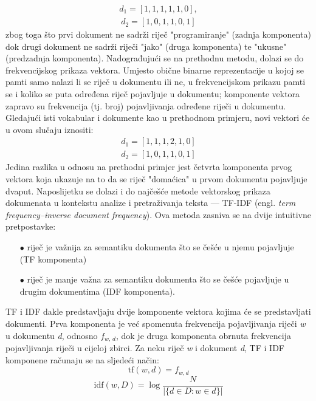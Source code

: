 \documentclass[times, utf8, zavrsni]{fer}
\begin{document}
\begin{align*}
{{d_{1}}=[1, 1, 1, 1, 1, 0]},
\end{align*}
\begin{align*}
{{d_{2}}=[1, 0, 1, 1, 0, 1]}
\end{align*}
zbog toga što prvi dokument ne sadrži riječ "programiranje" (zadnja komponenta) dok drugi dokument ne sadrži riječi "jako" (druga komponenta) te "ukusne" (predzadnja komponenta).
Nadograđujući se na prethodnu metodu, dolazi se do frekvencijskog prikaza vektora. Umjesto obične binarne reprezentacije u kojoj se pamti samo nalazi li se riječ u dokumentu ili ne, u frekvencijskom prikazu pamti se i koliko se puta određena riječ pojavljuje u dokumentu; komponente vektora zapravo su frekvencija (tj. broj) pojavljivanja određene riječi u dokumentu. Gledajući isti vokabular i dokumente kao u prethodnom primjeru, novi vektori će u ovom slučaju iznositi:
\begin{align*}
{{d_{1}}=[1, 1, 1, 2, 1, 0]}
\end{align*}
\begin{align*}
{{d_{2}}=[1, 0, 1, 1, 0, 1]}
\end{align*}
Jedina razlika u odnosu na prethodni primjer jest četvrta komponenta prvog vektora koja ukazuje na to da se riječ "domaćica" u prvom dokumentu pojavljuje dvaput.
Naposlijetku se dolazi i do najčešće metode vektorskog prikaza dokumenata u kontekstu analize i pretraživanja teksta — TF-IDF (engl. \textit{term frequency–inverse document frequency}). Ova metoda zasniva se na dvije intuitivne pretpostavke:
\begin{itemize}
\item[$\bullet$] riječ je važnija za semantiku dokumenta što se češće u njemu pojavljuje (TF komponenta)
\item[$\bullet$] riječ je manje važna za semantiku dokumenta što se češće pojavljuje u drugim dokumentima (IDF komponenta).
\end{itemize}
TF i IDF dakle predstavljaju dvije komponente vektora kojima će se predstavljati dokumenti. Prva komponenta je već spomenuta frekvencija pojavljivanja riječi \textit{w} u dokumentu \textit{d}, odnosno $f_\textit{w, d}$, dok je druga komponenta obrnuta frekvencija pojavljivanja riječi u cijeloj zbirci.
Za neku riječ \textit{w} i dokument \textit{d}, TF i IDF komponene računaju se na sljedeći način:
\begin{equation}
{\displaystyle \mathrm {tf} (w,d)=f_{w,d}}
\end{equation}
\begin{equation}
{\displaystyle \mathrm {idf} (w,D)=\log {\frac {N}{|\{d\in D:w\in d\}|}}}
\label{eq:idf}
\end{equation}
\end{document}
